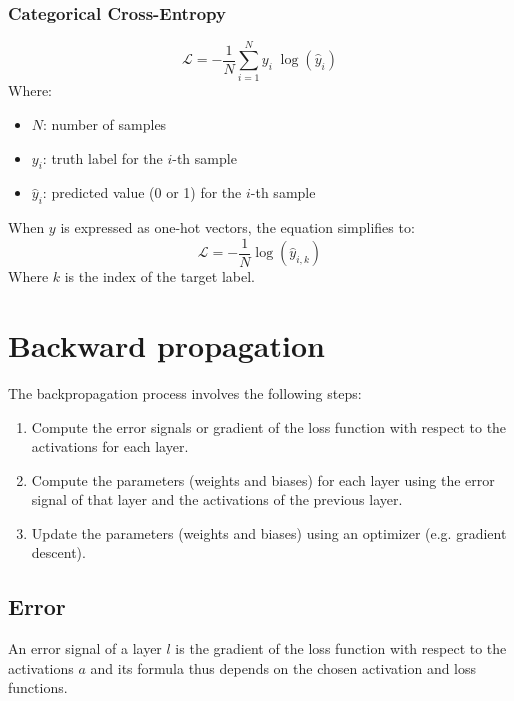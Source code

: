 \documentclass[a4paper]{report}
\newcommand{\haty}{\hat{y}}
\newcommand{\ELL}{\mathcal{L}}
\begin{document}
\subsubsection*{Categorical Cross-Entropy}
\begin{equation*}
    \ELL = -\frac{1}{N} \sum_{i=1}^{N} y_i \; \log(\haty_i)
\end{equation*}
Where:
\begin{itemize}
    \item $N$: number of samples
    \item $y_i$: truth label for the $i$-th sample
    \item $\haty_i$: predicted value (0 or 1) for the $i$-th sample
\end{itemize}
When $y$ is expressed as one-hot vectors, the equation simplifies to:
\begin{equation*}
    \ELL = -\frac{1}{N} \log(\haty_{i,k})
\end{equation*}
Where $k$ is the index of the target label.

\section{Backward propagation}
The backpropagation process involves the following steps:
\begin{enumerate}
    \item Compute the error signals or gradient of the loss function with respect to the activations for each layer.
    \item Compute the parameters (weights and biases) for each layer using the error signal of that layer and the activations of the previous layer.
    \item Update the parameters (weights and biases) using an optimizer (e.g. gradient descent).
\end{enumerate}

\subsection{Error}
An error signal of a layer $l$ is the gradient of the loss function with respect to the activations $a$ and its formula thus depends on the chosen activation and loss functions.
    
\end{document}
